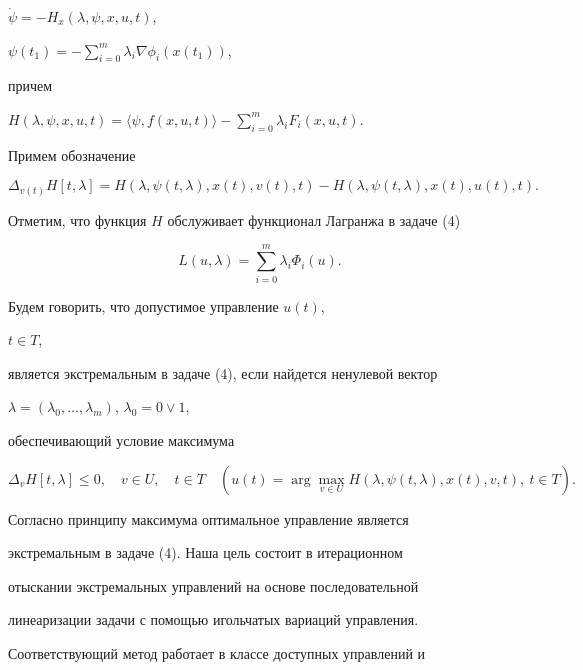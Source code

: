 $\Dot\psi=-H_x(\lambda,\psi,x,u,t)$, 


$\psi(t_1)=-\sum\limits^m_{i=0}\lambda_i\nabla\phi_i(x(t_1))$, 


причем 


$H(\lambda,\psi,x,u,t)=\langle\psi,f(x,u,t)\rangle- 


\sum\limits^m_{i=0}\lambda_i F_i(x,u,t)$. 


Примем обозначение 


$$ 


\Delta_{v(t)}H[t,\lambda]=H(\lambda,\psi(t,\lambda), 


x(t),v(t),t)-H(\lambda,\psi(t,\lambda),x(t),u(t),t). 


$$ 


Отметим, что функция $H$ обслуживает функционал Лагранжа в задаче (4) 


$$ 


L(u,\lambda)=\sum^m_{i=0}\lambda_i\Phi_i(u). 


$$ 


 


\begin{defnnonum} Будем говорить, что допустимое управление $u(t)$, 


$t\in T$, 


является экстремальным в задаче (4), если найдется ненулевой вектор 


$\lambda=(\lambda_0,\dotsc,\lambda_m)$, $\lambda_0=0\vee 1$, 


обеспечивающий условие максимума 


$$ 


\Delta_v H[t,\lambda]\le 0,\quad v\in U,\quad t\in T\quad 


(u(t)=\arg\max_{v\in U}H(\lambda,\psi(t,\lambda), 


x(t),v,t),\ t\in T). 


$$ 


\end{defnnonum} 


 


Согласно принципу максимума оптимальное управление является 


экстремальным в задаче (4). Наша цель состоит в итерационном 


отыскании экстремальных управлений на основе последовательной 


линеаризации задачи с помощью игольчатых вариаций управления. 


Соответствующий метод работает в классе доступных управлений и 


